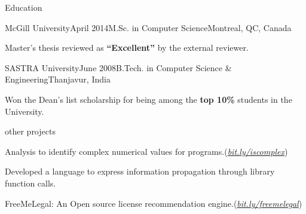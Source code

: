 \documentclass{resume} %
\begin{document}
\begin{rSection}{Education}

\begin{rSubsection}{McGill University}{April 2014}{M.Sc. in
Computer Science}{Montreal, QC, Canada} 
\item Master's thesis reviewed as \textbf{``Excellent''} by the external
reviewer.
\end{rSubsection}

\begin{rSubsection}{SASTRA University}{June 2008}{B.Tech. in Computer Science
\& Engineering}{Thanjavur, India} 
\item Won the {Dean's list scholarship} for being among the \textbf{top
10\%} students in the University. 
\end{rSubsection}

\end{rSection}

\begin{rSection}{other projects}\smallskip \begin{lSubsection}
%
\item Analysis to identify complex numerical values for \matlab
        programs.(\href{http://bit.ly/iscomplex}{\em{bit.ly/iscomplex}}) 
\begin{lsubSubsection}
\item Developed a language to express information propagation through library
function calls.%
\end{lsubSubsection}

\item FreeMeLegal: An Open source license recommendation
engine.(\href{http://bit.ly/freemelegal}{\em{bit.ly/freemelegal}}) 
\end{lSubsection}
\end{rSection}

\end{document}
